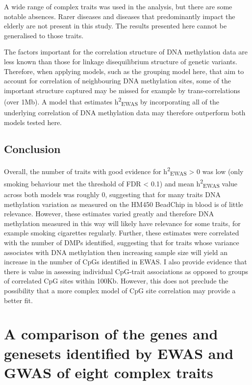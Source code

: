 \documentclass[11pt,oneside]{bristolthesis}
\begin{document}
A wide range of complex traits was used in the analysis, but there are some notable absences. Rarer diseases and diseases that predominantly impact the elderly are not present in this study. The results presented here cannot be generalised to those traits.

The factors important for the correlation structure of DNA methylation data are less known than those for linkage disequilibrium structure of genetic variants. Therefore, when applying models, such as the grouping model here, that aim to account for correlation of neighbouring DNA methylation sites, some of the important structure captured may be missed for example by trans-correlations (over 1Mb). A model that estimates h\textsuperscript{2}\textsubscript{EWAS} by incorporating all of the underlying correlation of DNA methylation data may therefore outperform both models tested here.

\hypertarget{conclusion-05}{%
\section{Conclusion}\label{conclusion-05}}

Overall, the number of traits with good evidence for h\textsuperscript{2}\textsubscript{EWAS} \textgreater{} 0 was low (only smoking behaviour met the threshold of FDR \textless{} 0.1) and mean h\textsuperscript{2}\textsubscript{EWAS} value across both models was roughly 0, suggesting that for many traits DNA methylation variation as measured on the HM450 BeadChip in blood is of little relevance. However, these estimates varied greatly and therefore DNA methylation measured in this way will likely have relevance for some traits, for example smoking cigarettes regularly. Further, these estimates were correlated with the number of DMPs identified, suggesting that for traits whose variance associates with DNA methylation then increasing sample size will yield an increase in the number of CpGs identified in EWAS. I also provide evidence that there is value in assessing individual CpG-trait associations as opposed to groups of correlated CpG sites within 100Kb. However, this does not preclude the possibility that a more complex model of CpG site correlation may provide a better fit.

\hypertarget{ewas-gwas-comp-chapter}{%
\chapter{A comparison of the genes and genesets identified by EWAS and GWAS of eight complex traits}\label{ewas-gwas-comp-chapter}}
\end{document}
